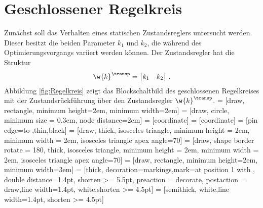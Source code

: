 \section{Geschlossener Regelkreis}
Zunächst soll das Verhalten eines statischen Zustandsreglers untersucht werden. Dieser besitzt die beiden Parameter $k_1$ und $k_2$, die während des Optimierungsvorgangs variiert werden können. Der Zustandsregler hat die Struktur
\[
\w{k}^\transp = 
\begin{bmatrix}
k_1 & k_2 \\
\end{bmatrix} \, .
\]
Abbildung \ref{fig:Regelkreis} zeigt das Blockschaltbild des geschlossenen Regelkreises mit der Zustandsrückführung über den Zustandsregler $\w{k}^\transp$.
 = [draw, rectangle, minimum height=2em, minimum width=2em]
 = [draw, circle, minimum size = 0.3cm, node distance=2cm]
 = [coordinate]
 = [coordinate]
 = [pin edge={to-,thin,black}]
 = [draw, thick, isosceles triangle, minimum height = 2em, minimum width = 2em, isosceles triangle apex angle=70]
 = [draw, shape border rotate = 180, thick, isosceles triangle, minimum height = 2em, minimum width = 2em, isosceles triangle apex angle=70]
 = [draw, rectangle, minimum height=2em, minimum width=3em]
 = [thick, decoration={markings,mark=at position 1 with {}},
double distance=1.4pt, shorten >= 5.5pt, preaction = {decorate}, postaction = {draw,line width=1.4pt, white,shorten >= 4.5pt}]
 = [semithick, white,line width=1.4pt, shorten >= 4.5pt]
